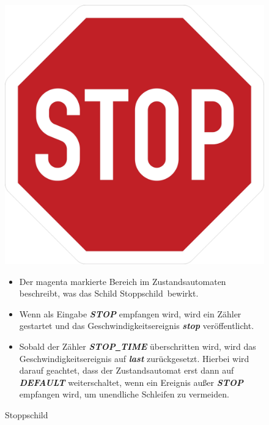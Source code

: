 \begin{figure}[h]
	\begin{minipage}[t]{4cm}
		\vspace{0pt}
		\centering
		\includegraphics[scale=0.04]{images/STOP.jpg}
		\caption{Stoppschild}
		\label{fig:PED}
	\end{minipage}
	\hfill
	\begin{minipage}[t]{10cm}
		\vspace{0pt}
		\begin{itemize}
			\item Der magenta markierte Bereich im Zustandsautomaten beschreibt, was das Schild \glqq Stoppschild\grqq \ bewirkt.
			
			\item Wenn als Eingabe \textbf{\textit{STOP}} empfangen wird, wird ein Z\"ahler gestartet und das Geschwindigkeitsereignis \textbf{\textit{stop}} ver\"offentlicht.
			
			\item Sobald der Z\"ahler \textbf{\textit{STOP\underline{\ }TIME}} \"uberschritten wird, wird das Geschwindigkeitsereignis auf \textbf{\textit{last}} zur\"uckgesetzt. Hierbei wird darauf geachtet, dass der Zustandsautomat erst dann auf \textbf{\textit{DEFAULT}} weiterschaltet, wenn ein Ereignis au\ss{}er \textbf{\textit{STOP}} empfangen wird, um unendliche Schleifen zu vermeiden.
		\end{itemize}
	\end{minipage}
\end{figure}


